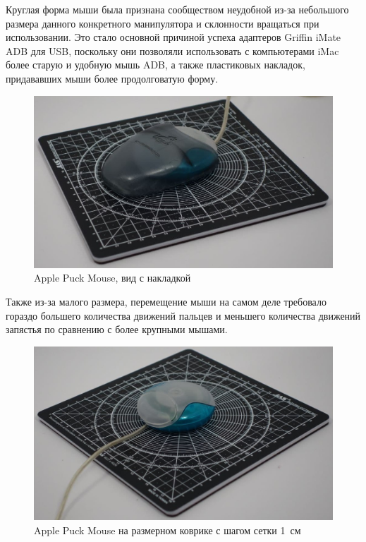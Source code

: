 \documentclass[11pt, a4paper]{article}
\begin{document}
Круглая форма мыши была признана сообществом неудобной из-за небольшого размера данного конкретного манипулятора и склонности вращаться при использовании. 
Это стало основной причиной успеха адаптеров Griffin iMate ADB для USB, поскольку они позволяли использовать с компьютерами iMac более старую и удобную мышь ADB, а также пластиковых накладок, придававших мыши более продолговатую форму. 

\begin{figure}[h]
    \centering
    \includegraphics[scale=0.23]{1998_apple_puck/appp.jpg}
    \caption{Apple Puck Mouse, вид с накладкой}
    \label{fig:addon}
\end{figure}

Также из-за малого размера, перемещение мыши на самом деле требовало гораздо большего количества движений  пальцев и  меньшего количества движений запястья по сравнению с более крупными мышами.

\begin{figure}[h]
    \centering
    \includegraphics[scale=0.3]{1998_apple_puck/appleset.jpg}
    \caption{Apple Puck Mouse на размерном коврике с шагом сетки 1~см}
    \label{fig:size}
\end{figure}
\end{document}
